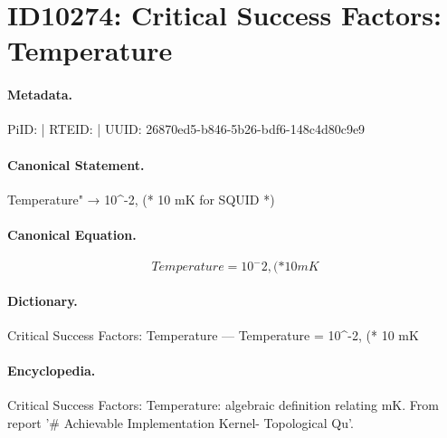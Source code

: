 \section*{ID10274: Critical Success Factors: Temperature}
\paragraph{Metadata.}
PiID:  | RTEID:  | UUID: 26870ed5-b846-5b26-bdf6-148c4d80c9e9

\paragraph{Canonical Statement.}
Temperature" → 10\textasciicircum{}-2, (* 10 mK for SQUID *)

\paragraph{Canonical Equation.}
\[
Temperature = 10^-2, (* 10 mK
\]

\paragraph{Dictionary.}
Critical Success Factors: Temperature — Temperature = 10\textasciicircum{}-2, (* 10 mK

\paragraph{Encyclopedia.}
Critical Success Factors: Temperature: algebraic definition relating mK. From report '\# Achievable Implementation Kernel- Topological Qu'.
